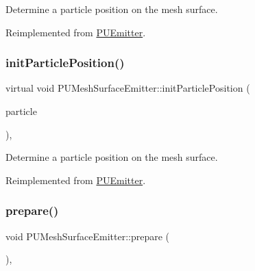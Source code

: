 Determine a particle position on the mesh surface. 

Reimplemented from \hyperlink{classPUEmitter_a2449f31b73c94a55f6559be71d56ca61}{P\+U\+Emitter}.

\mbox{\label{classPUMeshSurfaceEmitter_a868c19220258dc73548b344edd8f3e18}} 
\subsubsection{\texorpdfstring{init\+Particle\+Position()}{initParticlePosition()}\hspace{0.1cm}{\footnotesize\ttfamily [2/2]}}
{\footnotesize\ttfamily virtual void P\+U\+Mesh\+Surface\+Emitter\+::init\+Particle\+Position (\begin{DoxyParamCaption}\item[{\hyperlink{structPUParticle3D}{P\+U\+Particle3D} $\ast$}]{particle }\end{DoxyParamCaption})\hspace{0.3cm}{\ttfamily [override]}, {\ttfamily [virtual]}}

Determine a particle position on the mesh surface. 

Reimplemented from \hyperlink{classPUEmitter_a2449f31b73c94a55f6559be71d56ca61}{P\+U\+Emitter}.

\mbox{\label{classPUMeshSurfaceEmitter_ae4fdbd8c3760b68373ddce24b5d9ab11}} 
\subsubsection{\texorpdfstring{prepare()}{prepare()}\hspace{0.1cm}{\footnotesize\ttfamily [1/2]}}
{\footnotesize\ttfamily void P\+U\+Mesh\+Surface\+Emitter\+::prepare (\begin{DoxyParamCaption}{ }\end{DoxyParamCaption})\hspace{0.3cm}{\ttfamily [override]}, {\ttfamily [virtual]}}

